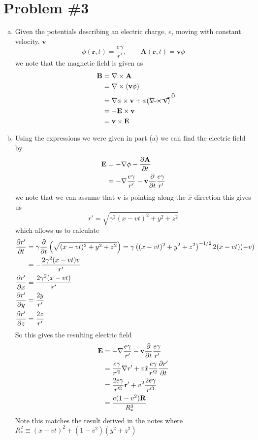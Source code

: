 \documentclass[11pt]{article}
\numberwithin{equation}{section}
\begin{document}
\pagebreak

\section{Problem \#3}
\begin{enumerate}[(a)]
\item
    Given the potentials describing an electric charge, $e$, moving with constant velocity, $\mathbf{v}$ 
    $$\phi(\mathbf{r},t) = \frac{e\gamma}{r'},\qquad \mathbf{A}(\mathbf{r},t) = \mathbf{v}\phi$$
    we note that the magnetic field is given as
    \begin{align*}
        \mathbf{B} &= \bold\nabla\times\mathbf{A}\\
                   &= \bold\nabla\times(\mathbf{v}\phi)\\
                   &= \bold\nabla\phi\times\mathbf{v} + \phi(\cancelto{0}{\bold\nabla\times\mathbf{v}})\\
                   &= -\mathbf{E}\times\mathbf{v}\\
                   &= \mathbf{v}\times\mathbf{E}
    \end{align*}

\item
    Using the expressions we were given in part (a) we can find the electric field by
    \begin{align*}
        \mathbf{E} &= -\bold\nabla\phi - \frac{\partial{\mathbf{A}}}{\partial{t}}\\
                   &= -\bold\nabla\frac{e\gamma}{r'} - \mathbf{v}\frac{\partial{}}{\partial{t}}\frac{e\gamma}{r'}
    \end{align*}
    we note that we can assume that $\mathbf{v}$ is pointing along the $\hat{x}$ direction this gives us
    $$r' = \sqrt{\gamma^2(x-vt)^2+y^2+z^2}$$
    which allows us to calculate
    \begin{align*}
        \frac{\partial{r'}}{\partial{t}} &= \gamma\frac{\partial{}}{\partial{t}}\left(\sqrt{(x-vt)^2+y^2+z^2}\right) = \gamma\left((x-vt)^2+y^2+z^2\right)^{-1/2}2(x-vt)(-v)\\
                         &= -\frac{2\gamma^2(x-vt)v}{r'}\\
        \frac{\partial{r'}}{\partial{x}} &= \frac{2\gamma^2(x-vt)}{r'}\\
        \frac{\partial{r'}}{\partial{y}} &= \frac{2y}{r'}\\
        \frac{\partial{r'}}{\partial{z}} &= \frac{2z}{r'}
    \end{align*}
    So this gives the resulting electric field
    \begin{align*}
        \mathbf{E} &= -\bold\nabla\frac{e\gamma}{r'} - \mathbf{v}\frac{\partial{}}{\partial{t}}\frac{e\gamma}{r'}\\
                   &= \frac{e\gamma}{r'^2}\bold\nabla{r'} + v\hat{x}\frac{e\gamma}{r'^2}\frac{\partial{r'}}{\partial{t}}\\
                   &= \frac{2e\gamma}{r'^3}\mathbf{r'} + v^2\frac{2e\gamma}{r'^3}\\
                   &= \frac{e(1-v^2)\mathbf{R}}{R_*^3}
    \end{align*}
    Note this matches the result derived in the notes where $R_*^2 \equiv (x-vt)^2 + (1-v^2)(y^2+z^2)$
    


\end{enumerate}
\end{document}
